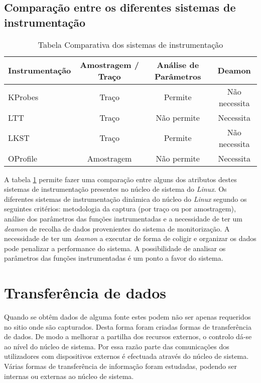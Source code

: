 
\subsection{Comparação entre os diferentes sistemas de instrumentação}
\begin{table}[h!]
\begin{center}
\begin{tabular}{|l||c|c|c|}
\hline
Instrumentação & Amostragem / Traço & Análise de Parâmetros & Deamon \\
\hline
KProbes & Traço & Permite & Não necessita \\
\hline
LTT & Traço & Não permite & Necessita \\
\hline
LKST & Traço & Permite & Não necessita \\
\hline
OProfile & Amostragem & Não permite & Necessita \\
\hline
\end{tabular}
\caption{Tabela Comparativa dos sistemas de instrumentação}
\label{tab:inst_compare}
\end{center}
\end{table}

A tabela \ref{tab:inst_compare} permite fazer uma comparação entre alguns dos atributos destes sistemas de instrumentação presentes no núcleo de sistema do \textit{Linux}. Os diferentes sistemas de instrumentação dinâmica do núcleo do \textit{Linux} segundo os seguintes critérios: metodologia da captura (por traço ou por amostragem), análise dos parâmetros das funções instrumentadas e a necessidade de ter um \textit{deamon} de recolha de dados provenientes do sistema de monitorização.
A necessidade de ter um \textit{deamon} a executar de forma de coligir e organizar os dados pode penalizar a performance do sistema. A possibilidade de analisar os parâmetros das funções instrumentadas é um ponto a favor do sistema. 

\section{Transferência de dados}\label{sect:kernel_user_comm}

Quando se obtêm dados de alguma fonte estes podem não ser apenas requeridos no sitio onde são capturados.
Desta forma foram criadas formas de transferência de dados.
De modo a melhorar a partilha dos recursos externos, o controlo dá-se ao nível do núcleo de sistema. Por essa razão parte das comunicações dos utilizadores com dispositivos externos é efectuada através do núcleo de sistema. Várias formas de transferência de informação foram estudadas, podendo ser internas ou externas ao núcleo de sistema.


